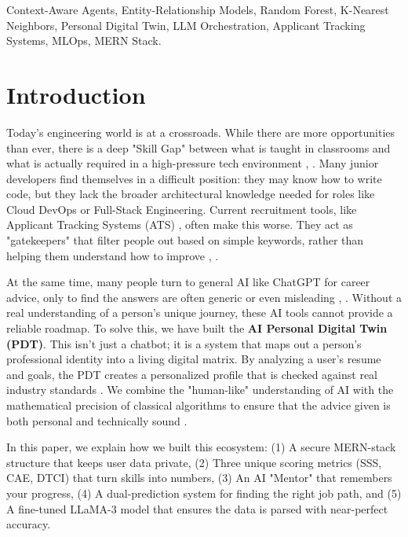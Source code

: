 \documentclass[conference]{IEEEtran}
\begin{document}
\begin{IEEEkeywords}
Context-Aware Agents, Entity-Relationship Models, Random Forest, K-Nearest Neighbors, Personal Digital Twin, LLM Orchestration, Applicant Tracking Systems, MLOps, MERN Stack.
\end{IEEEkeywords}

\section{Introduction}
Today’s engineering world is at a crossroads. While there are more opportunities than ever, there is a deep "Skill Gap" between what is taught in classrooms and what is actually required in a high-pressure tech environment \cite{b19}, \cite{b25}. Many junior developers find themselves in a difficult position: they may know how to write code, but they lack the broader architectural knowledge needed for roles like Cloud DevOps or Full-Stack Engineering. Current recruitment tools, like Applicant Tracking Systems (ATS) \cite{b7}, often make this worse. They act as "gatekeepers" that filter people out based on simple keywords, rather than helping them understand how to improve \cite{b22}, \cite{b24}.

At the same time, many people turn to general AI like ChatGPT for career advice, only to find the answers are often generic or even misleading \cite{b4}, \cite{b15}. Without a real understanding of a person’s unique journey, these AI tools cannot provide a reliable roadmap. To solve this, we have built the \textbf{AI Personal Digital Twin (PDT)}. This isn't just a chatbot; it is a system that maps out a person’s professional identity into a living digital matrix. By analyzing a user's resume and goals, the PDT creates a personalized profile that is checked against real industry standards \cite{b16}. We combine the "human-like" understanding of AI with the mathematical precision of classical algorithms to ensure that the advice given is both personal and technically sound \cite{b5}.

In this paper, we explain how we built this ecosystem: (1) A secure MERN-stack structure that keeps user data private, (2) Three unique scoring metrics (SSS, CAE, DTCI) that turn skills into numbers, (3) An AI "Mentor" that remembers your progress, (4) A dual-prediction system for finding the right job path, and (5) A fine-tuned LLaMA-3 model \cite{b1} that ensures the data is parsed with near-perfect accuracy.
\end{document}
